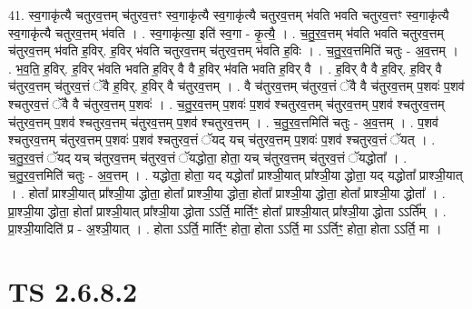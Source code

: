 \documentclass[17pt]{extarticle}
\begin{document}
41. स्व॒गाकृ॑त्यै चतुरव॒त्तम् च॑तुरव॒त्तꣳ स्व॒गाकृ॑त्यै स्व॒गाकृ॑त्यै चतुरव॒त्तम् भ॑वति भवति चतुरव॒त्तꣳ स्व॒गाकृ॑त्यै स्व॒गाकृ॑त्यै चतुरव॒त्तम् भ॑वति । . स्व॒गाकृ॑त्या॒ इति॑ स्व॒गा - कृ॒त्यै॒ । . च॒तु॒र॒व॒त्तम् भ॑वति भवति चतुरव॒त्तम् च॑तुरव॒त्तम् भ॑वति ह॒विर्. ह॒विर् भ॑वति चतुरव॒त्तम् च॑तुरव॒त्तम् भ॑वति ह॒विः । . च॒तु॒र॒व॒त्तमिति॑ चतुः - अ॒व॒त्तम् । . भ॒व॒ति॒ ह॒विर्. ह॒विर् भ॑वति भवति ह॒विर् वै वै ह॒विर् भ॑वति भवति ह॒विर् वै । . ह॒विर् वै वै ह॒विर्. ह॒विर् वै च॑तुरव॒त्तम् च॑तुरव॒त्तं ॅवै ह॒विर्. ह॒विर् वै च॑तुरव॒त्तम् । . वै च॑तुरव॒त्तम् च॑तुरव॒त्तं ॅवै वै च॑तुरव॒त्तम् प॒शवः॑ प॒शव॑ श्चतुरव॒त्तं ॅवै वै च॑तुरव॒त्तम् प॒शवः॑ । . च॒तु॒र॒व॒त्तम् प॒शवः॑ प॒शव॑ श्चतुरव॒त्तम् च॑तुरव॒त्तम् प॒शव॑ श्चतुरव॒त्तम् च॑तुरव॒त्तम् प॒शव॑ श्चतुरव॒त्तम् च॑तुरव॒त्तम् प॒शव॑ श्चतुरव॒त्तम् । . च॒तु॒र॒व॒त्तमिति॑ चतुः - अ॒व॒त्तम् । . प॒शव॑ श्चतुरव॒त्तम् च॑तुरव॒त्तम् प॒शवः॑ प॒शव॑ श्चतुरव॒त्तं ॅयद् यच् च॑तुरव॒त्तम् प॒शवः॑ प॒शव॑ श्चतुरव॒त्तं ॅयत् । . च॒तु॒र॒व॒त्तं ॅयद् यच् च॑तुरव॒त्तम् च॑तुरव॒त्तं ॅयद्धोता॒ होता॒ यच् च॑तुरव॒त्तम् च॑तुरव॒त्तं ॅयद्धोता᳚ । . च॒तु॒र॒व॒त्तमिति॑ चतुः - अ॒व॒त्तम् । . यद्धोता॒ होता॒ यद् यद्धोता᳚ प्राश्ञी॒यात् प्रा᳚श्ञी॒या द्धोता॒ यद् यद्धोता᳚ प्राश्ञी॒यात् । . होता᳚ प्राश्ञी॒यात् प्रा᳚श्ञी॒या द्धोता॒ होता᳚ प्राश्ञी॒या द्धोता॒ होता᳚ प्राश्ञी॒या द्धोता॒ होता᳚ प्राश्ञी॒या द्धोता᳚ । . प्रा॒श्ञी॒या द्धोता॒ होता᳚ प्राश्ञी॒यात् प्रा᳚श्ञी॒या द्धोता ऽऽर्ति॒ मार्तिꣳ॒॒ होता᳚ प्राश्ञी॒यात् प्रा᳚श्ञी॒या द्धोता ऽऽर्ति᳚म् । . प्रा॒श्ञी॒यादिति॑ प्र - अ॒श्ञी॒यात् । . होता ऽऽर्ति॒ मार्तिꣳ॒॒ होता॒ होता ऽऽर्ति॒ मा ऽऽर्तिꣳ॒॒ होता॒ होता ऽऽर्ति॒ मा । \newline
\pagebreak
{}

\section{ TS 2.6.8.2 }
\end{document}
